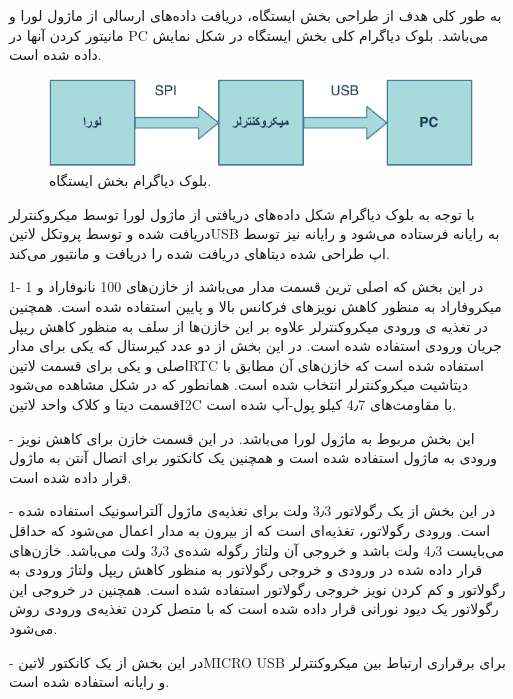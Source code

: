 به طور کلی هدف از طراحی بخش ایستگاه، دریافت داده‌های ارسالی از ماژول لورا و مانیتور کردن آنها در PC می‌باشد. بلوک دیاگرام کلی بخش ایستگاه در شکل  نمایش داده شده است.

\begin{figure}[!h]
	\centering
	\includegraphics[width=0.7\linewidth]{Assets/diagram2.pdf}
	\caption{بلوک دیاگرام بخش ایستگاه.}
	\label{fig:Diagram2}
\end{figure}

\noindent
با توجه به بلوک دیاگرام شکل  داده‌‌های دریافتی از ماژول لورا توسط میکروکنترلر دریافت شده و توسط پروتکل ‌لاتین{USB} به رایانه فرستاده می‌شود و رایانه نیز توسط اپ طراحی شده دیتاهای دریافت شده را دریافت و مانتیور می‌‌کند.



1- در این بخش که اصلی ترین قسمت مدار می‌باشد از خازن‌های 100 نانوفاراد و 1 میکروفاراد به منظور کاهش نویزهای فرکانس بالا و پایین استفاده شده است. همچنین در تغذیه ی ورودی میکروکنترلر علاوه بر این خازن‌ها از سلف به منظور کاهش ریپل جریان ورودی استفاده شده است. در این بخش از دو عدد کیرستال که یکی برای مدار اصلی و یکی برای قسمت ‌لاتین{RTC} استفاده شده است که خازن‌های آن مطابق با دیتاشیت میکروکنترلر انتخاب شده است. همانطور که در شکل مشاهده می‌شود قسمت دیتا و کلاک واحد ‌لاتین{I2C} با مقاومت‌های 4٫7 کیلو پول-آپ شده است.

-  این بخش مربوط به ماژول لورا می‌باشد. در این قسمت خازن برای کاهش نویز ورودی به ماژول استفاده شده است و همچنین یک کانکتور برای اتصال آنتن به ماژول قرار داده شده است. 

- در این بخش از یک رگولاتور ‌3٫3 ولت برای تغذیه‌ی ماژول آلتراسونیک استفاده شده است. ورودی رگولاتور،  تغذیه‌ای است که از بیرون به مدار اعمال می‌شود که حداقل می‌بایست 4٫3 ولت باشد و خروجی آن ولتاژ رگوله شده‌ی ‌3٫3 ولت می‌باشد. خازن‌های قرار داده شده در ورودی و خروجی رگولاتور به منظور کاهش ریپل ولتاژ ورودی به رگولاتور و کم کردن نویز خروجی رگولاتور استفاده شده است. همچنین در خروجی این رگولاتور یک دیود نورانی قرار داده شده است که با متصل کردن تغذیه‌ی ورودی روش می‌شود.

- در این بخش از یک کانکتور ‌لاتین{MICRO USB} برای برقراری ارتباط بین میکروکنترلر و رایانه استفاده شده است.

